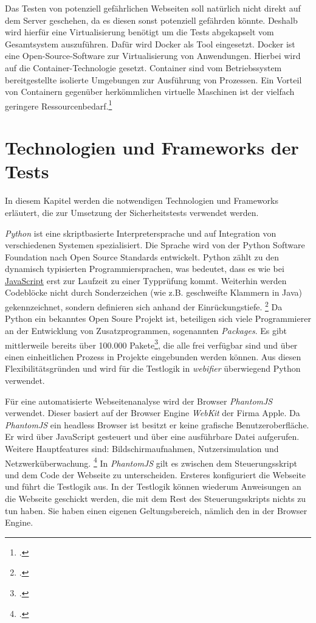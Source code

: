 Das Testen von potenziell gefährlichen Webseiten soll natürlich nicht direkt auf dem Server
geschehen, da es diesen sonst potenziell gefährden könnte. Deshalb wird hierfür eine
Virtualisierung benötigt um die Tests abgekapselt vom Gesamtsystem auszuführen. Dafür wird Docker
als Tool eingesetzt. Docker ist eine Open-Source-Software zur Virtualisierung von Anwendungen.
Hierbei wird auf die Container-Technologie gesetzt. Container sind vom Betriebssystem
bereitgestellte isolierte Umgebungen zur Ausführung von Prozessen. Ein Vorteil von Containern
gegenüber herkömmlichen virtuelle Maschinen ist der vielfach geringere Ressourcenbedarf.\footcite[Vgl.][]{docker}

\section{Technologien und Frameworks der Tests}

In diesem Kapitel werden die notwendigen Technologien und Frameworks erläutert, die zur Umsetzung
der Sicherheitstests verwendet werden.

\textit{Python} ist eine skriptbasierte Interpretersprache und auf Integration von
verschiedenen Systemen spezialisiert.
Die Sprache wird von der Python Software Foundation nach Open Source Standards entwickelt.
Python zählt zu den dynamisch typisierten Programmiersprachen, was bedeutet, dass es wie bei \hyperref[par:javascript]{JavaScript} erst zur Laufzeit zu einer Typprüfung kommt.
Weiterhin werden Codeblöcke nicht durch Sonderzeichen (wie z.B. geschweifte Klammern in Java)
gekennzeichnet, sondern definieren sich anhand der Einrückungstiefe.
\footcite[Vgl.][]{pythonHomepage}
Da Python ein bekanntes Open Soure Projekt ist, beteiligen sich viele Programmierer an der Entwicklung von Zusatzprogrammen, sogenannten \textit{Packages}.
Es gibt mittlerweile bereits über 100.000 Pakete\footcite[Vgl.][]{pypi}, die alle frei verfügbar sind und über einen einheitlichen Prozess in Projekte eingebunden werden können.
Aus diesen Flexibilitätsgründen und wird für die Testlogik in \textit{webifier} überwiegend Python verwendet.

\label{par:phantomjs}
Für eine automatisierte Webseitenanalyse wird der Browser \textit{PhantomJS} verwendet.
Dieser basiert auf der Browser Engine \textit{WebKit} der Firma Apple.
Da \textit{PhantomJS} ein headless Browser ist besitzt er keine grafische Benutzeroberfläche.
Er wird über JavaScript gesteuert und über eine ausführbare Datei aufgerufen.
Weitere Hauptfeatures sind: Bildschirmaufnahmen, Nutzersimulation und Netzwerküberwachung.
\footcite[Vgl.][]{phantomjs}
In \textit{PhantomJS} gilt es zwischen dem Steuerungsskript und dem Code der Webseite
zu unterscheiden.
Ersteres konfiguriert die Webseite und führt die Testlogik aus.
In der Testlogik können wiederum Anweisungen an die Webseite geschickt werden, die mit dem Rest des
Steuerungsskripts nichts zu tun haben. Sie haben einen eigenen Geltungsbereich, nämlich den in der
Browser Engine.

